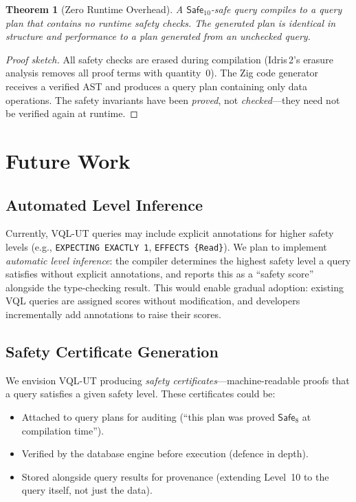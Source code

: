 \documentclass[11pt,a4paper]{article}
\newtheorem{theorem}{Theorem}[section]
\newcommand{\VQL}{\textsc{VQL-UT}}
\newcommand{\Safe}[1]{\ensuremath{\mathsf{Safe}_{#1}}}
\begin{document}
\begin{theorem}[Zero Runtime Overhead]
A \Safe{10}-safe query compiles to a query plan that contains no
runtime safety checks.  The generated plan is identical in structure
and performance to a plan generated from an unchecked query.
\end{theorem}

\begin{proof}[Proof sketch]
All safety checks are erased during compilation (Idris\,2's erasure
analysis removes all proof terms with quantity~$0$).  The Zig code
generator receives a verified AST and produces a query plan containing
only data operations.  The safety invariants have been \emph{proved},
not \emph{checked}---they need not be verified again at runtime.
\end{proof}

\section{Future Work}\label{sec:future}

\subsection{Automated Level Inference}

Currently, \VQL{} queries may include explicit annotations for
higher safety levels (e.g., \texttt{EXPECTING EXACTLY 1},
\texttt{EFFECTS \{Read\}}).  We plan to implement \emph{automatic
level inference}: the compiler determines the highest safety level
a query satisfies without explicit annotations, and reports this as a
``safety score'' alongside the type-checking result.  This would
enable gradual adoption: existing VQL queries are assigned scores
without modification, and developers incrementally add annotations to
raise their scores.

\subsection{Safety Certificate Generation}

We envision \VQL{} producing \emph{safety certificates}---machine-readable
proofs that a query satisfies a given safety level.  These certificates
could be:
\begin{itemize}[nosep]
  \item Attached to query plans for auditing (``this plan was proved
    \Safe{8} at compilation time'').
  \item Verified by the database engine before execution (defence in
    depth).
  \item Stored alongside query results for provenance (extending
    Level~10 to the query itself, not just the data).
\end{itemize}
\end{document}

